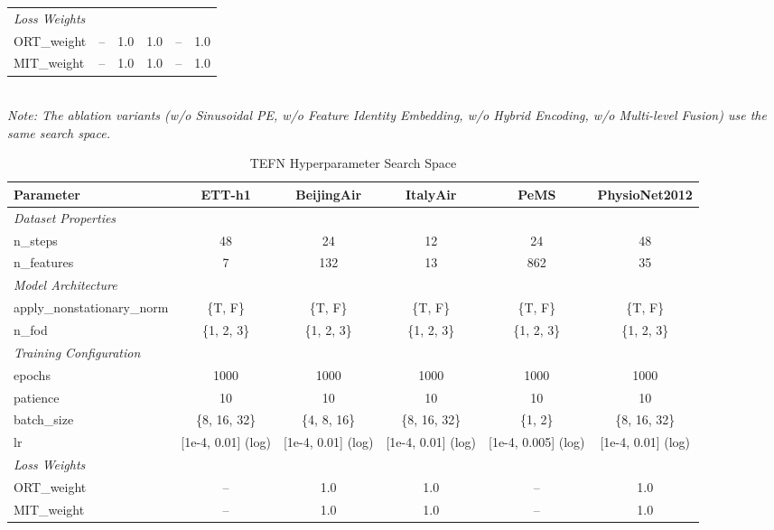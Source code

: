 \begin{table}[H]
\begin{adjustbox}{max width=\textwidth}
\begin{small}
\begin{tabular}{l|ccccc}
\midrule
\multicolumn{6}{l}{\textit{Loss Weights}} \\
ORT\_weight & -- & 1.0 & 1.0 & -- & 1.0 \\
MIT\_weight & -- & 1.0 & 1.0 & -- & 1.0 \\
\bottomrule
\end{tabular}
\end{small}
\end{adjustbox}
\\[2pt]
\footnotesize{\textit{Note: The ablation variants (w/o Sinusoidal PE, w/o Feature Identity Embedding, w/o Hybrid Encoding, w/o Multi-level Fusion) use the same search space.}}
\end{table}

\clearpage

\begin{table}[H]
\centering
\caption{TEFN Hyperparameter Search Space}
\label{tab:hyperparam_tefn}
\begin{adjustbox}{max width=\textwidth}
\begin{small}
\begin{tabular}{l|ccccc}
\toprule
\textbf{Parameter} & \textbf{ETT-h1} & \textbf{BeijingAir} & \textbf{ItalyAir} & \textbf{PeMS} & \textbf{PhysioNet2012} \\
\midrule
\multicolumn{6}{l}{\textit{Dataset Properties}} \\
n\_steps & 48 & 24 & 12 & 24 & 48 \\
n\_features & 7 & 132 & 13 & 862 & 35 \\
\midrule
\multicolumn{6}{l}{\textit{Model Architecture}} \\
apply\_nonstationary\_norm & \{T, F\} & \{T, F\} & \{T, F\} & \{T, F\} & \{T, F\} \\
n\_fod & \{1, 2, 3\} & \{1, 2, 3\} & \{1, 2, 3\} & \{1, 2, 3\} & \{1, 2, 3\} \\
\midrule
\multicolumn{6}{l}{\textit{Training Configuration}} \\
epochs & 1000 & 1000 & 1000 & 1000 & 1000 \\
patience & 10 & 10 & 10 & 10 & 10 \\
batch\_size & \{8, 16, 32\} & \{4, 8, 16\} & \{8, 16, 32\} & \{1, 2\} & \{8, 16, 32\} \\
lr & [1e-4, 0.01] (log) & [1e-4, 0.01] (log) & [1e-4, 0.01] (log) & [1e-4, 0.005] (log) & [1e-4, 0.01] (log) \\
\midrule
\multicolumn{6}{l}{\textit{Loss Weights}} \\
ORT\_weight & -- & 1.0 & 1.0 & -- & 1.0 \\
MIT\_weight & -- & 1.0 & 1.0 & -- & 1.0 \\
\bottomrule
\end{tabular}
\end{small}
\end{adjustbox}
\end{table}



